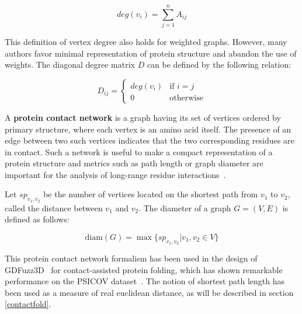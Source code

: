         \begin{equation}
            deg(v_i) = \sum\limits_{j=1}^{n} A_{ij}
        \end{equation}

        This definition of vertex degree also holds for weighted graphs. However, many authors favor minimal representation of protein structure
        and abandon the use of weights. The diagonal degree matrix $D$ can be defined by the following relation:

        \begin{equation}
            D_{ij} =
                \begin{cases}
                    deg(v_i) & \text{if } i = j \\
                    0 & \text{otherwise}
                \end{cases}
        \end{equation}

        A \textbf{protein contact network} is a graph having its set of vertices ordered by primary structure,
        where each vertex is an amino acid itself.
        The presence of an edge between two such vertices indicates that the
        two corresponding residues are in contact.
        Such a network is useful to make a compact
        representation of a protein structure and metrics such as path length or graph diameter are important for the analysis of long-range residue
        interactions~\cite{doi:10.1021/cr3002356}.

        Let $sp_{v_1,v_2}$ be the number of vertices located on the shortest path from $v_1$ to $v_2$, called the distance between $v_1$ and $v_2$.
        The diameter of a graph $G = (V, E)$ is defined as follows:

        \begin{equation}
            \text{diam}(G) = \max \{ sp_{v_1, v_2} | v_1, v_2 \in V \}
        \end{equation}

        This protein contact network formalism has been used in the design of GDFuzz3D~\cite{pietal2015gdfuzz3d}
        for contact-assisted protein folding, which has shown remarkable performance on the PSICOV
        dataset~\cite{doi:10.1093/bioinformatics/btr638}. The notion of shortest path length has been used as a measure
        of real euclidean distance, as will be described in section \ref{contactfold}.
